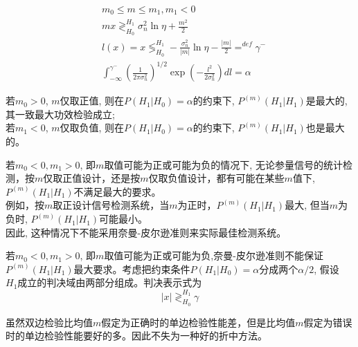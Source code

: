 \begin{frame}
\begin{align*}
&m_0\le m\le m_1,m_1<0\\
&mx\mathop{\gtrless}_{H_0}^{H_1}\sigma_n^2\ln\eta+\frac{m^2}{2}\\
&l(x)=x\mathop{\lessgtr}_{H_0}^{H_1}-\frac{\sigma_n^2}{|m|}\ln\eta-\frac{|m|}{2}\mathop{=}^{def}\gamma^-\\
&\int_{-\infty}^{\gamma^-}(\frac{1}{2\pi\sigma_n^2})^{1/2}\exp(-\frac{l^2}{2\sigma_n^2})dl=\alpha
\end{align*}
\end{frame}

\begin{frame}
若$m_0>0$, $m$仅取正值, 则在$P(H_1|H_0)=\alpha$的约束下, $P^{(m)}(H_1|H_1)$是最大的,其一致最大功效检验成立;\\
若$m_1<0$, $m$仅取负值, 则在$P(H_1|H_0)=\alpha$的约束下, $P^{(m)}(H_1|H_1)$也是最大的。
\end{frame}

\begin{frame}
若$m_0<0,m_1>0$, 即$m$取值可能为正或可能为负的情况下, 无论参量信号的统计检测，按$m$仅取正值设计，还是按$m$仅取负值设计，都有可能在某些$m$值下,   $P^{(m)}(H_1|H_1)$不满足最大的要求。\\
例如，按$m$取正设计信号检测系统，当$m$为正时，$P^{(m)}(H_1|H_1)$最大, 但当$m$为负时, $P^{(m)}(H_1|H_1)$可能最小。\\
因此, 这种情况下不能采用奈曼-皮尔逊准则来实际最佳检测系统。
\end{frame}

\begin{frame}
若$m_0<0,m_1>0$, 即$m$取值可能为正或可能为负,奈曼-皮尔逊准则不能保证$P^{(m)}(H_1|H_1)$最大要求。考虑把约束条件$P(H_1|H_0)=\alpha$分成两个$\alpha/2$, 假设$H_1成立$的判决域由两部分组成。判决表示式为
	\[|x|\mathop{\gtrless}_{H_0}^{H_1}\gamma \]

\begin{block}{}
	虽然双边检验比均值$m$假定为正确时的单边检验性能差，但是比均值$m$假定为错误时的单边检验性能要好的多。因此不失为一种好的折中方法。
\end{block}
\end{frame}

